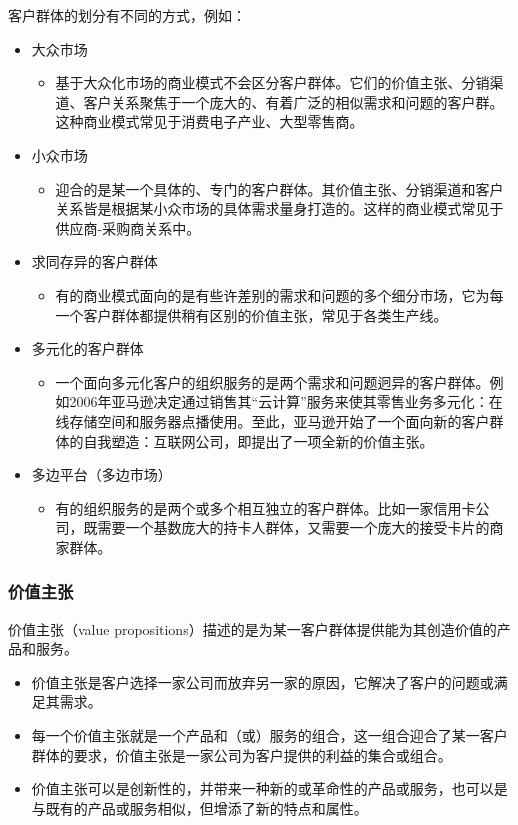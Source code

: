 	客户群体的划分有不同的方式，例如：
	\begin{itemize}
		\item 大众市场
		\begin{itemize}
			\item 基于大众化市场的商业模式不会区分客户群体。它们的价值主张、分销渠道、客户关系聚焦于一个庞大的、有着广泛的相似需求和问题的客户群。这种商业模式常见于消费电子产业、大型零售商。
		\end{itemize}
		\item 小众市场
		\begin{itemize}
			\item 迎合的是某一个具体的、专门的客户群体。其价值主张、分销渠道和客户关系皆是根据某小众市场的具体需求量身打造的。这样的商业模式常见于供应商-采购商关系中。
		\end{itemize}
		\item 求同存异的客户群体
		\begin{itemize}
			\item 有的商业模式面向的是有些许差别的需求和问题的多个细分市场，它为每一个客户群体都提供稍有区别的价值主张，常见于各类生产线。
		\end{itemize}
		\item 多元化的客户群体
		\begin{itemize}
			\item 一个面向多元化客户的组织服务的是两个需求和问题迥异的客户群体。例如2006年亚马逊决定通过销售其“云计算”服务来使其零售业务多元化：在线存储空间和服务器点播使用。至此，亚马逊开始了一个面向新的客户群体的自我塑造：互联网公司，即提出了一项全新的价值主张。
		\end{itemize}
		\item 多边平台（多边市场）
		\begin{itemize}
			\item 有的组织服务的是两个或多个相互独立的客户群体。比如一家信用卡公司，既需要一个基数庞大的持卡人群体，又需要一个庞大的接受卡片的商家群体。
		\end{itemize}
	\end{itemize}

	\subsubsection{价值主张}
	价值主张（value propositions）描述的是为某一客户群体提供能为其创造价值的产品和服务。
	\begin{itemize}
		\item 价值主张是客户选择一家公司而放弃另一家的原因，它解决了客户的问题或满足其需求。
		\item 每一个价值主张就是一个产品和（或）服务的组合，这一组合迎合了某一客户群体的要求，价值主张是一家公司为客户提供的利益的集合或组合。
		\item 价值主张可以是创新性的，并带来一种新的或革命性的产品或服务，也可以是与既有的产品或服务相似，但增添了新的特点和属性。
	\end{itemize}


